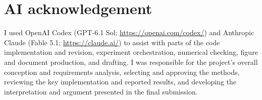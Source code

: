 \documentclass[a4paper,10pt]{article}
\begin{document}
\section*{AI acknowledgement}
I used OpenAI Codex (GPT-6.1 Sol; \url{https://openai.com/codex/}) and Anthropic Claude (Fable 5.1; \url{https://claude.ai/}) to assist with parts of the code implementation and revision, experiment orchestration, numerical checking, figure and document production, and drafting. I was responsible for the project's overall conception and requirements analysis, selecting and approving the methods, reviewing the key implementation and reported results, and developing the interpretation and argument presented in the final submission.

\clearpage{}
\end{document}
